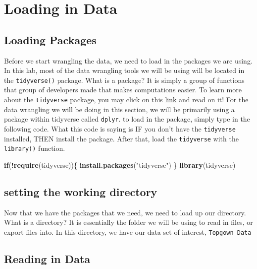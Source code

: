\documentclass[]{book}
\newenvironment{Shaded}{\begin{snugshade}}{\end{snugshade}}
\newcommand{\KeywordTok}[1]{\textcolor[rgb]{0.13,0.29,0.53}{\textbf{#1}}}
\newcommand{\StringTok}[1]{\textcolor[rgb]{0.31,0.60,0.02}{#1}}
\newcommand{\ControlFlowTok}[1]{\textcolor[rgb]{0.13,0.29,0.53}{\textbf{#1}}}
\newcommand{\OperatorTok}[1]{\textcolor[rgb]{0.81,0.36,0.00}{\textbf{#1}}}
\newcommand{\NormalTok}[1]{#1}
\begin{document}
\section{Loading in Data}\label{loading-in-data}

\subsection{Loading Packages}\label{loading-packages}

Before we start wrangling the data, we need to load in the packages we
are using. In this lab, most of the data wrangling tools we will be
using will be located in the \texttt{tidyverse()} package. What is a
package? It is simply a group of functions that group of developers made
that makes computations easier. To learn more about the
\texttt{tidyverse} package, you may click on this
\href{https://www.tidyverse.org/}{link} and read on it! For the data
wrangling we will be doing in this section, we will be primarily using a
package within tidyverse called \texttt{dplyr}. to load in the package,
simply type in the following code. What this code is saying is IF you
don't have the \texttt{tidyverse} installed, THEN install the package.
After that, load the \texttt{tidyverse} with the \texttt{library()}
function.

\begin{Shaded}
\begin{Highlighting}[]
\ControlFlowTok{if}\NormalTok{(}\OperatorTok{!}\KeywordTok{require}\NormalTok{(tidyverse))\{}
    \KeywordTok{install.packages}\NormalTok{(}\StringTok{"tidyverse"}\NormalTok{)}
\NormalTok{\}}
\KeywordTok{library}\NormalTok{(tidyverse) }
\end{Highlighting}
\end{Shaded}

\subsection{setting the working
directory}\label{setting-the-working-directory}

Now that we have the packages that we need, we need to load up our
directory. What is a directory? It is essentially the folder we will be
using to read in files, or export files into. In this directory, we have
our data set of interest, \texttt{Topgown\_Data}

\subsection{Reading in Data}\label{reading-in-data}
\end{document}
